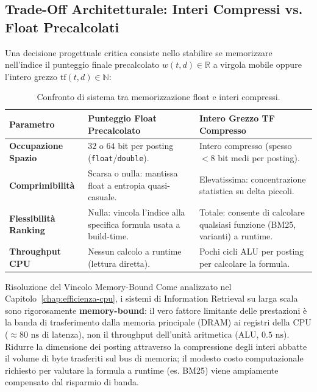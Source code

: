 \subsection{Trade-Off Architetturale: Interi Compressi vs. Float Precalcolati}
Una decisione progettuale critica consiste nello stabilire se memorizzare nell'indice il punteggio finale precalcolato $w(t, d) \in \mathbb{R}$ a virgola mobile oppure l'intero grezzo $\text{tf}(t, d) \in \mathbb{N}$:

\begin{table}[H]
\centering
\small
\begin{tabularx}{\linewidth}{l X X}
\toprule
\textbf{Parametro} & \textbf{Punteggio Float Precalcolato} & \textbf{Intero Grezzo TF Compresso} \\
\midrule
\textbf{Occupazione Spazio} & $32$ o $64$ bit per posting (\texttt{float}/\texttt{double}). & Intero compresso (spesso $< 8$ bit medi per posting). \\
\addlinespace
\textbf{Comprimibilit\`a} & Scarsa o nulla: mantissa float a entropia quasi-casuale. & Elevatissima: concentrazione statistica su delta piccoli. \\
\addlinespace
\textbf{Flessibilit\`a Ranking} & Nulla: vincola l'indice alla specifica formula usata a build-time. & Totale: consente di calcolare qualsiasi funzione (BM25, varianti) a runtime. \\
\addlinespace
\textbf{Throughput CPU} & Nessun calcolo a runtime (lettura diretta). & Pochi cicli ALU per posting per calcolare la formula. \\
\bottomrule
\end{tabularx}
\caption{Confronto di sistema tra memorizzazione float e interi compressi.}
\label{tab:float-vs-int}
\end{table}

\begin{noteblock}{Risoluzione del Vincolo Memory-Bound}
Come analizzato nel Capitolo~\ref{chap:efficienza-cpu}, i sistemi di Information Retrieval su larga scala sono rigorosamente \textbf{memory-bound}: il vero fattore limitante delle prestazioni \`e la banda di trasferimento dalla memoria principale (DRAM) ai registri della CPU ($\approx 80\text{ ns}$ di latenza), non il throughput dell'unit\`a aritmetica (ALU, $0.5\text{ ns}$). Ridurre la dimensione dei posting attraverso la compressione degli interi abbatte il volume di byte trasferiti sul bus di memoria; il modesto costo computazionale richiesto per valutare la formula a runtime (es. BM25) viene ampiamente compensato dal risparmio di banda.
\end{noteblock}

